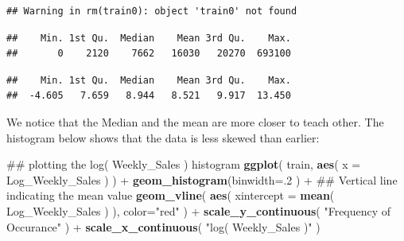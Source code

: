 \documentclass[]{article}
\newenvironment{Shaded}{\begin{snugshade}}{\end{snugshade}}
\newcommand{\KeywordTok}[1]{\textcolor[rgb]{0.13,0.29,0.53}{\textbf{{#1}}}}
\newcommand{\DataTypeTok}[1]{\textcolor[rgb]{0.13,0.29,0.53}{{#1}}}
\newcommand{\DecValTok}[1]{\textcolor[rgb]{0.00,0.00,0.81}{{#1}}}
\newcommand{\StringTok}[1]{\textcolor[rgb]{0.31,0.60,0.02}{{#1}}}
\newcommand{\NormalTok}[1]{{#1}}
\begin{document}
\begin{verbatim}
## Warning in rm(train0): object 'train0' not found
\end{verbatim}

\begin{Shaded}
\end{Shaded}

\begin{verbatim}
##    Min. 1st Qu.  Median    Mean 3rd Qu.    Max. 
##       0    2120    7662   16030   20270  693100
\end{verbatim}

\begin{Shaded}
\end{Shaded}

\begin{verbatim}
##    Min. 1st Qu.  Median    Mean 3rd Qu.    Max. 
##  -4.605   7.659   8.944   8.521   9.917  13.450
\end{verbatim}

We notice that the Median and the mean are more closer to teach other.
The histogram below shows that the data is less skewed than earlier:

\begin{Shaded}
\begin{Highlighting}[]
\NormalTok{## plotting the log( Weekly_Sales ) histogram}
\KeywordTok{ggplot}\NormalTok{( train, }\KeywordTok{aes}\NormalTok{( }\DataTypeTok{x =} \NormalTok{Log_Weekly_Sales ) ) +}
\StringTok{  }\KeywordTok{geom_histogram}\NormalTok{(}\DataTypeTok{binwidth=}\NormalTok{.}\DecValTok{2} \NormalTok{) +}\StringTok{ }
\StringTok{  }\NormalTok{## Vertical line indicating the mean value}
\StringTok{  }\KeywordTok{geom_vline}\NormalTok{( }\KeywordTok{aes}\NormalTok{( }\DataTypeTok{xintercept =} \KeywordTok{mean}\NormalTok{( Log_Weekly_Sales ) ), }\DataTypeTok{color=}\StringTok{"red"} \NormalTok{) +}
\StringTok{  }\KeywordTok{scale_y_continuous}\NormalTok{( }\StringTok{"Frequency of Occurance"} \NormalTok{) +}
\StringTok{  }\KeywordTok{scale_x_continuous}\NormalTok{( }\StringTok{"log( Weekly_Sales )"} \NormalTok{)}
\end{Highlighting}
\end{Shaded}
\end{document}
